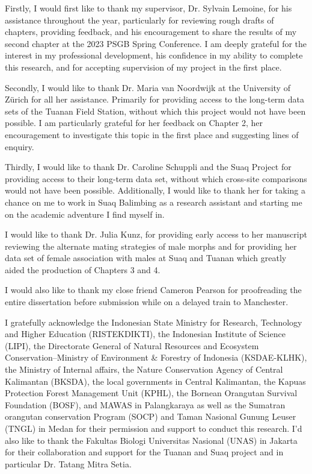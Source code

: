 
\begin{acknowledgements}      

Firstly, I would first like to thank my supervisor, Dr. Sylvain Lemoine, for his assistance throughout the year, particularly for reviewing rough drafts of chapters, providing feedback, and his encouragement to share the results of my second chapter at the 2023 PSGB Spring Conference. I am deeply grateful for the interest in my professional development, his confidence in my ability to complete this research, and for accepting supervision of my project in the first place.

Secondly, I would like to thank Dr. Maria van Noordwijk at the University of Zürich for all her assistance. Primarily for providing access to the long-term data sets of the Tuanan Field Station, without which this project would not have been possible. I am particularly grateful for her feedback on Chapter 2, her encouragement to investigate this topic in the first place and suggesting lines of enquiry.

Thirdly, I would like to thank Dr. Caroline Schuppli and the Suaq Project for providing access to their long-term data set, without which cross-site comparisons would not have been possible. Additionally, I would like to thank her for taking a chance on me to work in Suaq Balimbing as a research assistant and starting me on the academic adventure I find myself in.

I would like to thank Dr. Julia Kunz, for providing early access to her manuscript reviewing the alternate mating strategies of male morphs and for providing her data set of female association with males at Suaq and Tuanan which greatly aided the production of Chapters 3 and 4. 

I would also like to thank my close friend Cameron Pearson for proofreading the entire dissertation before submission while on a delayed train to Manchester.

I gratefully acknowledge the Indonesian State Ministry for Research, Technology and Higher Education (RISTEKDIKTI), the Indonesian Institute of Science (LIPI), the Directorate General of Natural Resources and Ecosystem Conservation–Ministry of Environment \& Forestry of Indonesia (KSDAE-KLHK), the Ministry of Internal affairs, the Nature Conservation Agency of Central Kalimantan (BKSDA), the local governments in Central Kalimantan, the Kapuas Protection Forest Management Unit (KPHL), the Bornean Orangutan Survival Foundation (BOSF), and MAWAS in Palangkaraya as well as the Sumatran orangutan conservation Program (SOCP) and Taman Nasional Gunung Leuser (TNGL) in Medan for their permission and support to conduct this research. I'd also like to thank the Fakultas Biologi Universitas Nasional (UNAS) in Jakarta for their collaboration and support for the Tuanan and Suaq project and in particular Dr. Tatang Mitra Setia. 
 

\end{acknowledgements}
